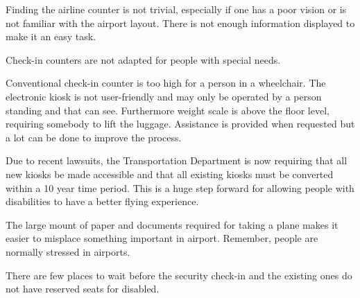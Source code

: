 \documentclass[a4paper, 12pt,conference]{new_cit_thesis}
\begin{document}
\begin{list}{-}{}
  \item Finding the airline counter is not trivial, especially if one has a poor vision or is not familiar with the airport layout. There is not enough information displayed to make it an easy task.
  \item Check-in counters are not adapted for people with special needs. 
  \item Conventional check-in counter is too high for a person in a wheelchair. The electronic kiosk is not user-friendly and may only be operated by a person standing and that can see. Furthermore weight scale is above the floor level, requiring somebody to lift the luggage. Assistance is provided when requested but a lot can be done to improve the process.
  \item Due to recent lawsuits, the Transportation Department is now requiring that all new kiosks be made accessible and that all existing kiosks must be converted within a 10 year time period.  This is a huge step forward for allowing people with disabilities to have a better flying experience.
  \item The large mount of paper and documents required for taking a plane makes it easier to misplace something important in airport. Remember, people are normally stressed in airports.
  \item There are few places to wait before the security check-in and the existing ones do not have reserved seats for disabled.


\end{list}
\end{document}

